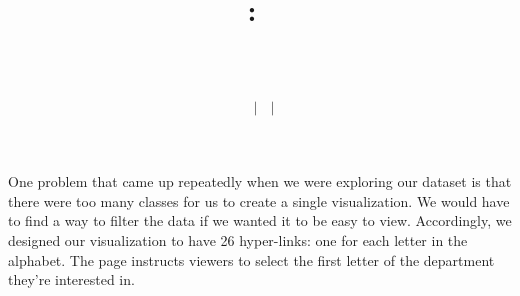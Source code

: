 \documentclass{article}
\title{
    \vspace{2in}
    \textmd{\textbf{\hmwkClass:\ \hmwkTitle}}\\
    \vspace{0.2in}\large{\textit{\hmwkClassInstructor\ \hmwkClassTime}}\\
    \author{\textbf{\hmwkAuthorName\ $\vert$ \hmwkAuthorCSE\ $\vert$ \hmwkAuthorId}}
}
\date{}
\begin{document}
One problem that came up repeatedly when we were exploring our dataset is that there were too many classes for us to create a single visualization. We would have to find a way to filter the data if we wanted it to be easy to view. Accordingly, we designed our visualization to have 26 hyper-links: one for each letter in the alphabet. The page instructs viewers to select the first letter of the department they're interested in.
\end{document}
